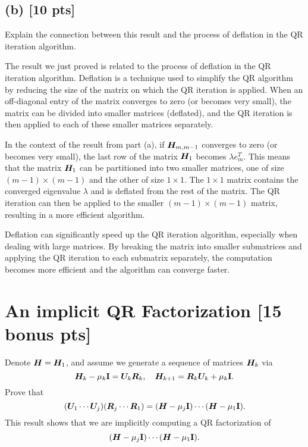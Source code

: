 \documentclass[twoside,10pt]{article}
\begin{document}
\subsection*{(b) [10 pts]}
Explain the connection between this result and the process of deflation in the QR iteration algorithm. 

\quad The result we just proved is related to the process of deflation in the QR iteration algorithm. Deflation is a technique used to simplify the QR algorithm by reducing the size of the matrix on which the QR iteration is applied. When an off-diagonal entry of the matrix converges to zero (or becomes very small), the matrix can be divided into smaller matrices (deflated), and the QR iteration is then applied to each of these smaller matrices separately.

In the context of the result from part (a), if $\bm{H}_{m, m-1}$ converges to zero (or becomes very small), the last row of the matrix $\bm{H}_1$ becomes $\lambda e_m^T$. This means that the matrix $\bm{H}_1$ can be partitioned into two smaller matrices, one of size $(m-1) \times (m-1)$ and the other of size $1 \times 1$. The $1 \times 1$ matrix contains the converged eigenvalue $\lambda$ and is deflated from the rest of the matrix. The QR iteration can then be applied to the smaller $(m-1) \times (m-1)$ matrix, resulting in a more efficient algorithm.

Deflation can significantly speed up the QR iteration algorithm, especially when dealing with large matrices. By breaking the matrix into smaller submatrices and applying the QR iteration to each submatrix separately, the computation becomes more efficient and the algorithm can converge faster.

\section{An implicit QR Factorization [15 bonus pts]}
Denote $\bm{H} = \bm{H}_1$, and assume we generate a sequence of matrices $\bm{H}_k$ via 
\begin{equation}
  \bm{H}_k - \mu_k \mathbf{I} = \bm{U}_k \bm{R}_k, \quad \bm{H}_{k + 1} = \bm{R}_k \bm{U}_k + \mu_k \mathbf{I}. 
\end{equation}
Prove that 
\begin{equation}
  \left(\mtx{U}_1 \cdots \mtx{U}_j\right)\left(\mtx{R}_j \cdots \mtx{R}_1\right) = \left(\mtx{H} - \mu_{j} \Id\right) \cdots \left(\mtx{H} - \mu_1 \Id\right). 
\end{equation}
This result shows that we are implicitly computing a QR factorization of 
\begin{equation}
  \left(\mtx{H} - \mu_j \Id\right) \cdots \left(\mtx{H} - \mu_1 \Id\right).   
\end{equation}
\end{document}
